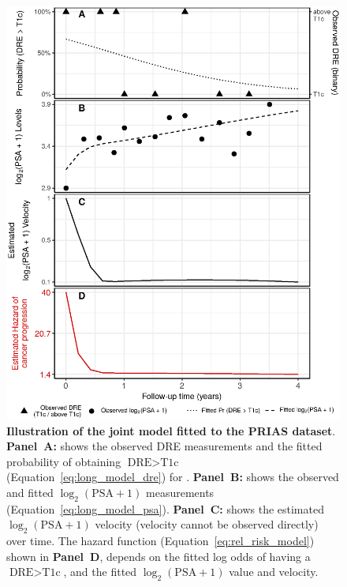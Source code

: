 \begin{figure}[!htb]
\captionsetup{justification=justified}
\centerline{\includegraphics[width=\columnwidth]{images/jmExplanationPlot_1757.eps}}
\caption{\textbf{Illustration of the joint model fitted to the PRIAS dataset}. \textbf{Panel~A:} shows the observed DRE measurements and the fitted probability of obtaining $\mbox{DRE} > \mbox{T1c}$ (Equation~\ref{eq:long_model_dre}) for . \textbf{Panel~B:} shows the observed and fitted $\log_2(\mbox{PSA} + 1)$ measurements (Equation~\ref{eq:long_model_psa}). \textbf{Panel~C:} shows the estimated $\log_2(\mbox{PSA} + 1)$ velocity (velocity cannot be observed directly) over time. The hazard function (Equation~\ref{eq:rel_risk_model}) shown in \textbf{Panel~D}, depends on the fitted log odds of having a $\mbox{DRE} > \mbox{T1c}$, and the fitted $\log_2(\mbox{PSA} + 1)$ value and velocity.}
\label{fig:jmExplanationPlot_1757}
\end{figure}

